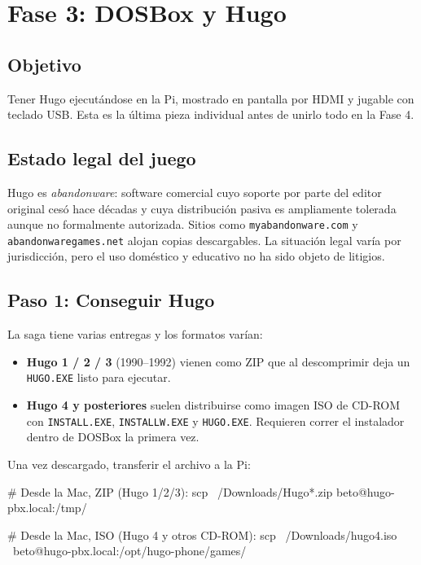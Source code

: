 \chapter{Fase 3: DOSBox y Hugo}

\section{Objetivo}

Tener Hugo ejecutándose en la Pi, mostrado en pantalla por HDMI y jugable con teclado USB. Esta es la última pieza individual antes de unirlo todo en la Fase 4.

\section{Estado legal del juego}

Hugo es \emph{abandonware}: software comercial cuyo soporte por parte del editor original cesó hace décadas y cuya distribución pasiva es ampliamente tolerada aunque no formalmente autorizada. Sitios como \texttt{myabandonware.com} y \texttt{abandonwaregames.net} alojan copias descargables. La situación legal varía por jurisdicción, pero el uso doméstico y educativo no ha sido objeto de litigios.

\section{Paso 1: Conseguir Hugo}

La saga tiene varias entregas y los formatos varían:

\begin{itemize}
  \item \textbf{Hugo 1 / 2 / 3} (1990--1992) vienen como ZIP que al descomprimir deja un \texttt{HUGO.EXE} listo para ejecutar.
  \item \textbf{Hugo 4 y posteriores} suelen distribuirse como imagen ISO de CD-ROM con \texttt{INSTALL.EXE}, \texttt{INSTALLW.EXE} y \texttt{HUGO.EXE}. Requieren correr el instalador dentro de DOSBox la primera vez.
\end{itemize}

Una vez descargado, transferir el archivo a la Pi:

\begin{shellcode}
# Desde la Mac, ZIP (Hugo 1/2/3):
scp ~/Downloads/Hugo*.zip beto@hugo-pbx.local:/tmp/

# Desde la Mac, ISO (Hugo 4 y otros CD-ROM):
scp ~/Downloads/hugo4.iso \
  beto@hugo-pbx.local:/opt/hugo-phone/games/
\end{shellcode}

